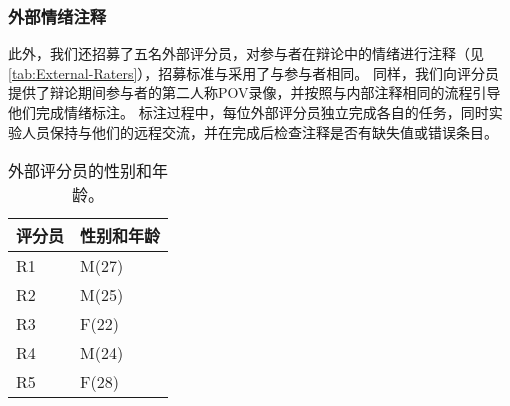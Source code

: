 \subsubsection{外部情绪注释}
此外，我们还招募了五名外部评分员，对参与者在辩论中的情绪进行注释（见\autoref{tab:External-Raters}），招募标准与采用了与参与者相同。
同样，我们向评分员提供了辩论期间参与者的第二人称POV录像，并按照与内部注释相同的流程引导他们完成情绪标注。
标注过程中，每位外部评分员独立完成各自的任务，同时实验人员保持与他们的远程交流，并在完成后检查注释是否有缺失值或错误条目。
\begin{table}[htbp]
    \centering
    \footnotesize
    \setlength{\abovecaptionskip}{-0.1cm}
    \setlength{\belowcaptionskip}{0.2cm}
    \renewcommand\arraystretch{1.5}
    \caption[外部评分员的性别和年龄。]{外部评分员的性别和年龄。}
    \label{tab:External-Raters}
    \begin{tabular}{|p{3cm}|p{3cm}|}
    \hline
    评分员 & 性别和年龄 \\ \hline
    R1  & M(27) \\ \hline
    R2  & M(25) \\ \hline
    R3  & F(22) \\ \hline
    R4  & M(24) \\ \hline
    R5  & F(28) \\ \hline
    \end{tabular}
    \end{table}
